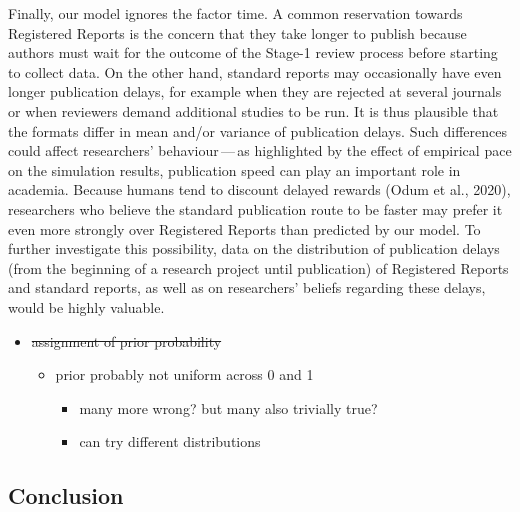 \documentclass[
  ,man,mask,floatsintext]{apa6}
\providecommand{\tightlist}{%
  \setlength{\itemsep}{0pt}\setlength{\parskip}{0pt}}
\begin{document}
Finally, our model ignores the factor time.
A common reservation towards Registered Reports is the concern that they take longer to publish because authors must wait for the outcome of the Stage-1 review process before starting to collect data.
On the other hand, standard reports may occasionally have even longer publication delays, for example when they are rejected at several journals or when reviewers demand additional studies to be run.
It is thus plausible that the formats differ in mean and/or variance of publication delays.
Such differences could affect researchers' behaviour\(\,\)---\(\,\)as highlighted by the effect of empirical pace on the simulation results, publication speed can play an important role in academia.
Because humans tend to discount delayed rewards (Odum et al., 2020), researchers who believe the standard publication route to be faster may prefer it even more strongly over Registered Reports than predicted by our model.
To further investigate this possibility, data on the distribution of publication delays (from the beginning of a research project until publication) of Registered Reports and standard reports, as well as on researchers' beliefs regarding these delays, would be highly valuable.

\begin{itemize}
\tightlist
\item
  \sout{assignment of prior probability}

  \begin{itemize}
  \tightlist
  \item
    prior probably not uniform across 0 and 1

    \begin{itemize}
    \tightlist
    \item
      many more wrong? but many also trivially true?
    \item
      can try different distributions
    \end{itemize}
  \end{itemize}
\end{itemize}

\hypertarget{conclusion}{%
\subsection{Conclusion}\label{conclusion}}
\end{document}
